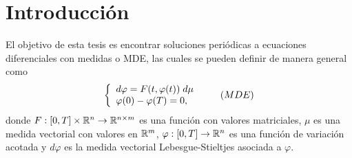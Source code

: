 

\chapter{Introducción}
El objetivo de esta tesis es encontrar soluciones periódicas a ecuaciones diferenciales con medidas o MDE, las cuales se pueden definir de manera general como 
\begin{equation*}
	\left\lbrace \begin{array}{l} \label{eq:problema A}
		d\varphi=F(t,\varphi(t))\;d \mu\\
		\varphi(0)-\varphi(T)=0,
	\end{array}\right. \tag{${MDE}$}
\end{equation*}
donde $F:[0,T]\times\mathbb{R}^n\to\mathbb{R}^{n\times m}$ es una función con valores matriciales, $\mu$ es una medida vectorial con valores en $\mathbb{R}^m$, $\varphi:[0,T]\to \mathbb{R}^n$ es una función de variación acotada  y $d\varphi$ es la medida vectorial Lebesgue-Stieltjes asociada a $\varphi$.

